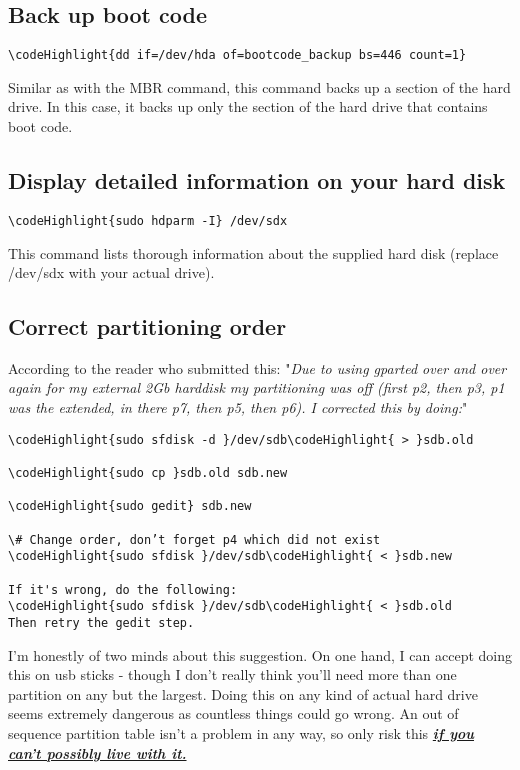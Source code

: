 \documentclass[12pt,a4paper]{article}
\begin{document}
\subsection{Back up boot code}
\begin{Verbatim}[commandchars=\\\{\}]
\codeHighlight{dd if=/dev/hda of=bootcode_backup bs=446 count=1}
\end{Verbatim}
Similar as with the MBR command, this command backs up a section of the hard drive. In this case, it backs up only the section of the hard drive that contains boot code.

\subsection{Display detailed information on your hard disk}
\begin{Verbatim}[commandchars=\\\{\}]
\codeHighlight{sudo hdparm -I} /dev/sdx
\end{Verbatim}
This command lists thorough information about the supplied hard disk (replace /dev/sdx with your actual drive).

\subsection{Correct partitioning order}
According to the reader who submitted this:
"\textit{Due to using gparted over and over again for my external 2Gb harddisk my partitioning was off (first p2, then p3, p1 was the extended, in there p7, then p5, then p6).
I corrected this by doing:}"
\begin{Verbatim}[commandchars=\\\{\}]
\codeHighlight{sudo sfdisk -d }/dev/sdb\codeHighlight{ > }sdb.old

\codeHighlight{sudo cp }sdb.old sdb.new

\codeHighlight{sudo gedit} sdb.new 

\# Change order, don’t forget p4 which did not exist
\codeHighlight{sudo sfdisk }/dev/sdb\codeHighlight{ < }sdb.new

If it's wrong, do the following:
\codeHighlight{sudo sfdisk }/dev/sdb\codeHighlight{ < }sdb.old
Then retry the gedit step.
\end{Verbatim}
I'm honestly of two minds about this suggestion.  On one hand, I can accept doing this on usb sticks - though I don't really think you'll need more than one partition on any but the largest.  Doing this on any kind of actual hard drive seems extremely dangerous as countless things could go wrong. An out of sequence partition table isn't a problem in any way, so only risk this \underline{\textbf{\textit{if you can't possibly live with it.}}}
\end{document}
